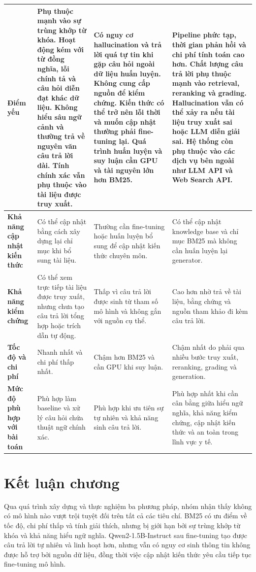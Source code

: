 \documentclass[12pt,a4paper,oneside]{report}
\begin{document}
\begin{longtable}{@{}>{\raggedright\arraybackslash}p{2.25cm}>{\raggedright\arraybackslash}p{4.32cm}>{\raggedright\arraybackslash}p{4.32cm}>{\raggedright\arraybackslash}p{4.32cm}@{}}
\textbf{Điểm yếu}
& Phụ thuộc mạnh vào sự trùng khớp từ khóa. Hoạt động kém với từ đồng nghĩa, lỗi chính tả và câu hỏi diễn đạt khác dữ liệu. Không hiểu sâu ngữ cảnh và thường trả về nguyên văn câu trả lời dài. Tính chính xác vẫn phụ thuộc vào tài liệu được truy xuất.
& Có nguy cơ hallucination và trả lời quá tự tin khi gặp câu hỏi ngoài dữ liệu huấn luyện. Không cung cấp nguồn để kiểm chứng. Kiến thức có thể trở nên lỗi thời và muốn cập nhật thường phải fine-tuning lại. Quá trình huấn luyện và suy luận cần GPU và tài nguyên lớn hơn BM25.
& Pipeline phức tạp, thời gian phản hồi và chi phí tính toán cao hơn. Chất lượng câu trả lời phụ thuộc mạnh vào retrieval, reranking và grading. Hallucination vẫn có thể xảy ra nếu tài liệu truy xuất sai hoặc LLM diễn giải sai. Hệ thống còn phụ thuộc vào các dịch vụ bên ngoài như LLM API và Web Search API.\\
\midrule

\textbf{Khả năng cập nhật kiến thức}
& Có thể cập nhật bằng cách xây dựng lại chỉ mục khi bổ sung tài liệu.
& Thường cần fine-tuning hoặc huấn luyện bổ sung để cập nhật kiến thức chuyên môn.
& Có thể cập nhật knowledge base và chỉ mục BM25 mà không cần huấn luyện lại generator.\\
\midrule

\textbf{Khả năng kiểm chứng}
& Có thể xem trực tiếp tài liệu được truy xuất, nhưng chưa tạo câu trả lời tổng hợp hoặc trích dẫn tự động.
& Thấp vì câu trả lời được sinh từ tham số mô hình và không gắn với nguồn cụ thể.
& Cao hơn nhờ trả về tài liệu, bằng chứng và nguồn tham khảo đi kèm câu trả lời.\\
\midrule

\textbf{Tốc độ và chi phí}
& Nhanh nhất và chi phí thấp nhất.
& Chậm hơn BM25 và cần GPU khi suy luận.
& Chậm nhất do phải qua nhiều bước truy xuất, reranking, grading và generation.\\
\midrule

\textbf{Mức độ phù hợp với bài toán}
& Phù hợp làm baseline và xử lý câu hỏi chứa thuật ngữ chính xác.
& Phù hợp khi ưu tiên sự tự nhiên và khả năng sinh câu trả lời.
& Phù hợp nhất khi cần cân bằng giữa hiểu ngữ nghĩa, khả năng kiểm chứng, cập nhật kiến thức và an toàn trong lĩnh vực y tế.\\
\end{longtable}
\endgroup

\section{Kết luận chương}
Qua quá trình xây dựng và thực nghiệm ba phương pháp, nhóm nhận thấy không có mô hình nào vượt trội tuyệt đối trên tất cả các tiêu chí. BM25 có ưu điểm về tốc độ, chi phí thấp và tính giải thích, nhưng bị giới hạn bởi sự trùng khớp từ khóa và khả năng hiểu ngữ nghĩa. Qwen2-1.5B-Instruct sau fine-tuning tạo được câu trả lời tự nhiên và linh hoạt hơn, nhưng vẫn có nguy cơ sinh thông tin không được hỗ trợ bởi nguồn dữ liệu, đồng thời việc cập nhật kiến thức yêu cầu tiếp tục fine-tuning mô hình.
\end{document}
